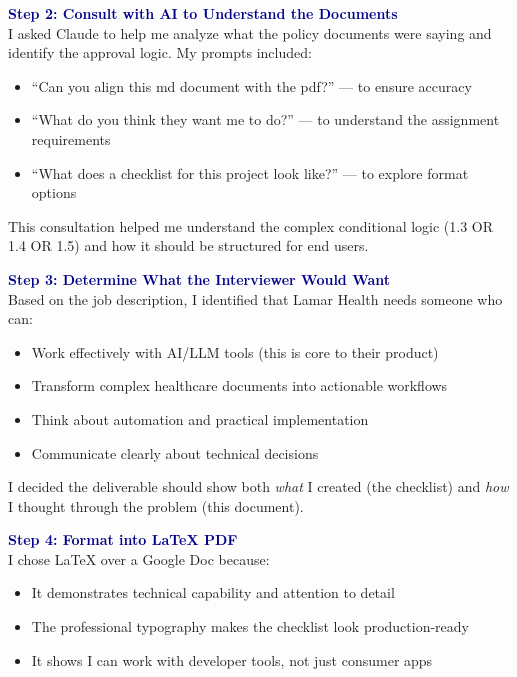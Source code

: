\documentclass[11pt,letterpaper]{article}
\begin{document}
\vspace{0.25cm}

\textcolor{darkblue}{\bfseries\large Step 2: Consult with AI to Understand the Documents}\\[0.1cm]
I asked Claude to help me analyze what the policy documents were saying and identify the approval logic. My prompts included:
\begin{itemize}
    \item ``Can you align this md document with the pdf?'' --- to ensure accuracy
    \item ``What do you think they want me to do?'' --- to understand the assignment requirements
    \item ``What does a checklist for this project look like?'' --- to explore format options
\end{itemize}

This consultation helped me understand the complex conditional logic (1.3 OR 1.4 OR 1.5) and how it should be structured for end users.

\vspace{0.25cm}

\textcolor{darkblue}{\bfseries\large Step 3: Determine What the Interviewer Would Want}\\[0.1cm]
Based on the job description, I identified that Lamar Health needs someone who can:
\begin{itemize}
    \item Work effectively with AI/LLM tools (this is core to their product)
    \item Transform complex healthcare documents into actionable workflows
    \item Think about automation and practical implementation
    \item Communicate clearly about technical decisions
\end{itemize}

I decided the deliverable should show both \textit{what} I created (the checklist) and \textit{how} I thought through the problem (this document).

\vspace{0.25cm}

\textcolor{darkblue}{\bfseries\large Step 4: Format into LaTeX PDF}\\[0.1cm]
I chose LaTeX over a Google Doc because:
\begin{itemize}
    \item It demonstrates technical capability and attention to detail
    \item The professional typography makes the checklist look production-ready
    \item It shows I can work with developer tools, not just consumer apps
\end{itemize}
\end{document}
